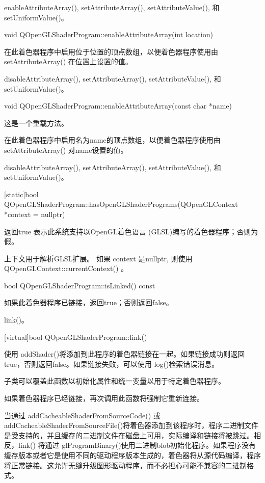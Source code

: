 \begin{seeAlso}
enableAttributeArray(), setAttributeArray(), setAttributeValue(), 和 setUniformValue()。
\end{seeAlso}

void QOpenGLShaderProgram::enableAttributeArray(int location)

在此着色器程序中启用位于位置的顶点数组，以便着色器程序使用由 setAttributeArray() 在位置上设置的值。


\begin{seeAlso}
disableAttributeArray(), setAttributeArray(), setAttributeValue(), 和 setUniformValue()。
\end{seeAlso}

void QOpenGLShaderProgram::enableAttributeArray(const char *name)

这是一个重载方法。

在此着色器程序中启用名为name的顶点数组，以便着色器程序使用由 setAttributeArray() 对name设置的值。

\begin{seeAlso}
disableAttributeArray(), setAttributeArray(), setAttributeValue(), 和 setUniformValue()。
\end{seeAlso}

[static]bool QOpenGLShaderProgram::hasOpenGLShaderPrograms(QOpenGLContext *context = nullptr)

返回true 表示此系统支持以OpenGL着色语言 (GLSL)编写的着色器程序；否则为假。

上下文用于解析GLSL扩展。 如果 context 是nullptr, 则使用QOpenGLContext::currentContext() 。

bool QOpenGLShaderProgram::isLinked() const

如果此着色器程序已链接，返回true；否则返回false。


\begin{seeAlso}
link()。
\end{seeAlso}

[virtual]bool QOpenGLShaderProgram::link()

使用 addShader()将添加到此程序的着色器链接在一起。如果链接成功则返回true，否则返回false。如果链接失败，可以使用 log()检索错误消息。

子类可以覆盖此函数以初始化属性和统一变量以用于特定着色器程序。

如果着色器程序已经链接，再次调用此函数将强制它重新连接。

当通过 addCacheableShaderFromSourceCode() 或 addCacheableShaderFromSourceFile()将着色器添加到该程序时，程序二进制文件是受支持的，并且缓存的二进制文件在磁盘上可用，实际编译和链接将被跳过。相反，link() 将通过 glProgramBinary()使用二进制blob初始化程序。如果程序没有缓存版本或者它是使用不同的驱动程序版本生成的，着色器将从源代码编译，程序将正常链接。这允许无缝升级图形驱动程序，而不必担心可能不兼容的二进制格式。


